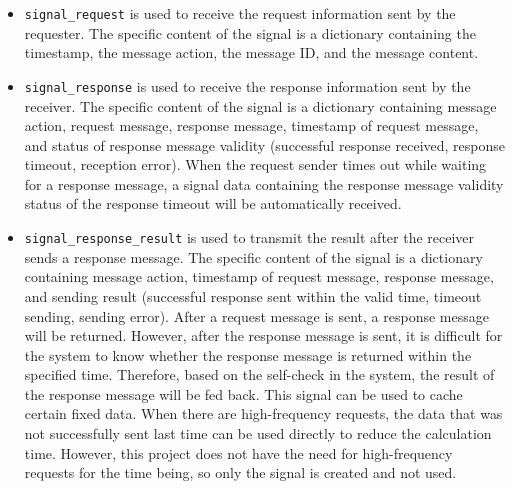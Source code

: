 \documentclass[
	english,
	ruledheaders=section,%
	class=report,%
	thesis={type=Report},%
	accentcolor=9c,%
	custommargins=true,%
	marginpar=false,%
	parskip=half-,%
	fontsize=11pt,%
	logofile={img/tuda_logo.pdf}, %
]{tudapub}
\begin{document}
\begin{itemize}

    \item \texttt{signal\_request} is used to receive the request information sent by the requester. The specific content of the signal is a dictionary containing the timestamp, the message action, the message ID, and the message content. 
    \item \texttt{signal\_response} is used to receive the response information sent by the receiver. The specific content of the signal is a dictionary containing message action, request message, response message, timestamp of request message, and status of response message validity (successful response received, response timeout, reception error). When the request sender times out while waiting for a response message, a signal data containing the response message validity status of the response timeout will be automatically received. 
    \item \texttt{signal\_response\_result} is used to transmit the result after the receiver sends a response message. The specific content of the signal is a dictionary containing message action, timestamp of request message, response message, and sending result (successful response sent within the valid time, timeout sending, sending error). After a request message is sent, a response message will be returned. However, after the response message is sent, it is difficult for the system to know whether the response message is returned within the specified time. Therefore, based on the self-check in the system, the result of the response message will be fed back. This signal can be used to cache certain fixed data. When there are high-frequency requests, the data that was not successfully sent last time can be used directly to reduce the calculation time. However, this project does not have the need for high-frequency requests for the time being, so only the signal is created and not used.
\end{itemize}
\end{document}

